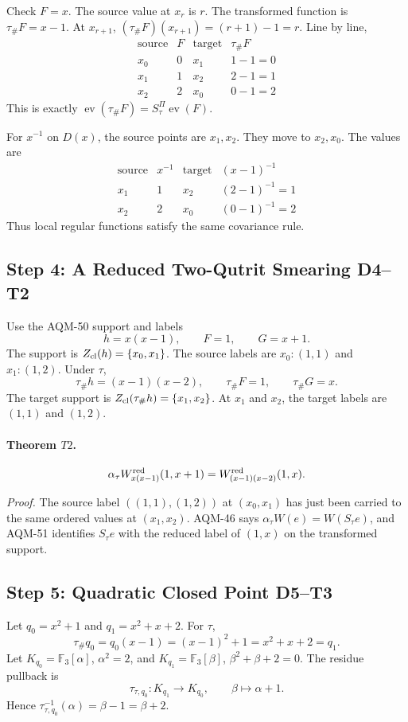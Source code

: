Check \(F=x\).  The source value at \(x_r\) is \(r\).  The transformed function
is \(\tau_\#F=x-1\).  At \(x_{r+1}\), \((\tau_\#F)(x_{r+1})=(r+1)-1=r\).
Line by line,
\[
\begin{array}{c|c|c|c}
\text{source}&F&\text{target}&\tau_\#F\\
\hline
x_0&0&x_1&1-1=0\\
x_1&1&x_2&2-1=1\\
x_2&2&x_0&0-1=2
\end{array}
\]
This is exactly \(\operatorname{ev}(\tau_\#F)=S_\tau^\Pi\operatorname{ev}(F)\).

For \(x^{-1}\) on \(D(x)\), the source points are \(x_1,x_2\).  They move to
\(x_2,x_0\).  The values are
\[
\begin{array}{c|c|c|c}
\text{source}&x^{-1}&\text{target}&(x-1)^{-1}\\
\hline
x_1&1&x_2&(2-1)^{-1}=1\\
x_2&2&x_0&(0-1)^{-1}=2
\end{array}
\]
Thus local regular functions satisfy the same covariance rule.

\subsection{Step 4: A Reduced Two-Qutrit Smearing D4--T2}
Use the AQM-50 support and labels
\[
  h=x(x-1),\qquad F=1,\qquad G=x+1.
\]
The support is \(Z_{\rm cl}(h)=\{x_0,x_1\}\).  The source labels are
\(x_0:(1,1)\) and \(x_1:(1,2)\).
Under \(\tau\),
\[
  \tau_\#h=(x-1)(x-2),\qquad \tau_\#F=1,\qquad \tau_\#G=x.
\]
The target support is \(Z_{\rm cl}(\tau_\#h)=\{x_1,x_2\}\).  At \(x_1\) and
\(x_2\), the target labels are \((1,1)\) and \((1,2)\).

\paragraph{Theorem \(T2\).}
\[
  \alpha_\tau W_{x(x-1)}^{\rm red}(1,x+1)=
  W_{(x-1)(x-2)}^{\rm red}(1,x).
\]

\emph{Proof.}
The source label \(((1,1),(1,2))\) at \((x_0,x_1)\) has just been carried to
the same ordered values at \((x_1,x_2)\).  AQM-46 says
\(\alpha_\tau W(e)=W(S_\tau e)\), and AQM-51 identifies
\(S_\tau e\) with the reduced label of \((1,x)\) on the transformed support.

\subsection{Step 5: Quadratic Closed Point D5--T3}
Let \(q_0=x^2+1\) and \(q_1=x^2+x+2\).
For \(\tau\),
\[
  \tau_\#q_0=q_0(x-1)=(x-1)^2+1=x^2+x+2=q_1.
\]
Let \(K_{q_0}=\mathbb F_3[\alpha]\), \(\alpha^2=2\), and
\(K_{q_1}=\mathbb F_3[\beta]\), \(\beta^2+\beta+2=0\).
The residue pullback is
\[
  \tau_{\tau,q_0}:K_{q_1}\to K_{q_0},\qquad
  \beta\longmapsto\alpha+1.
\]
Hence \(\tau_{\tau,q_0}^{-1}(\alpha)=\beta-1=\beta+2\).

